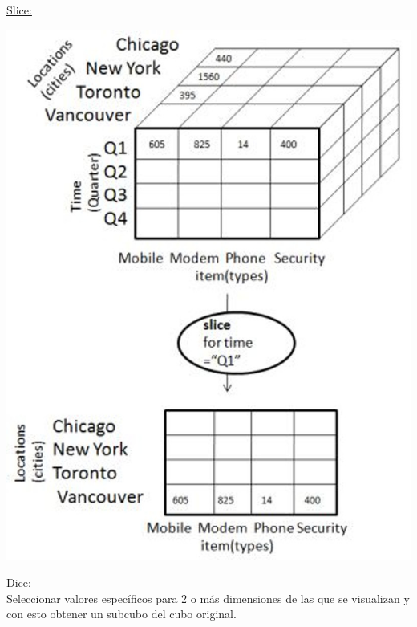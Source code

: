 \documentclass{fancyslides}
\begin{document}
\begin{frame}
\misc
{
  \underline{Slice:}
  \begin{center}
  \includegraphics[scale=0.15]{slice}
  \end{center}
}
\end{frame}


\begin{frame}
\misc
{
  \underline{Dice:}\\
  Seleccionar valores específicos para 2 o más dimensiones de las que se visualizan
  y con esto obtener un subcubo del cubo original.
}
\end{frame}
\end{document}
